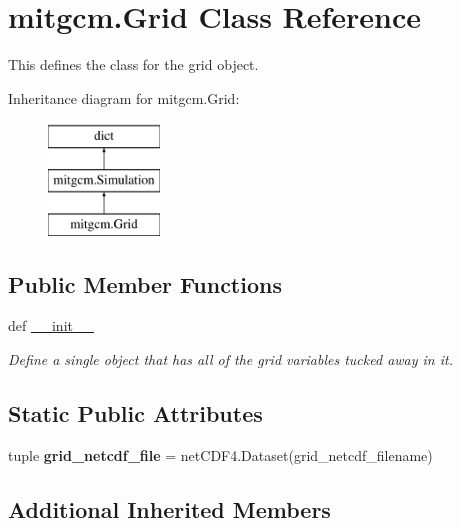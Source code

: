 \hypertarget{classmitgcm_1_1Grid}{\section{mitgcm.\+Grid Class Reference}
\label{classmitgcm_1_1Grid}
}


This defines the class for the grid object.  


Inheritance diagram for mitgcm.\+Grid\+:\begin{figure}[H]
\begin{center}
\leavevmode
\includegraphics[height=3.000000cm]{classmitgcm_1_1Grid}
\end{center}
\end{figure}
\subsection*{Public Member Functions}
\begin{DoxyCompactItemize}
\item 
def \hyperlink{classmitgcm_1_1Grid_a156118c888f3135853c7c3c493c03232}{\+\_\+\+\_\+init\+\_\+\+\_\+}
\begin{DoxyCompactList}\small\item\em Define a single object that has all of the grid variables tucked away in it. \end{DoxyCompactList}\end{DoxyCompactItemize}
\subsection*{Static Public Attributes}
\begin{DoxyCompactItemize}
\item 
\hypertarget{classmitgcm_1_1Grid_aa45aab99b16e38406392f0be871fb6b4}{tuple {\bfseries grid\+\_\+netcdf\+\_\+file} = net\+C\+D\+F4.\+Dataset(grid\+\_\+netcdf\+\_\+filename)}\label{classmitgcm_1_1Grid_aa45aab99b16e38406392f0be871fb6b4}

\end{DoxyCompactItemize}
\subsection*{Additional Inherited Members}


